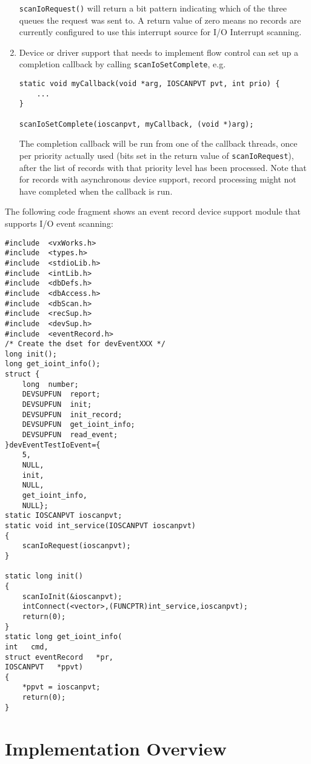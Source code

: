 \begin{enumerate}
\verb|scanIoRequest()| will return a bit pattern indicating which of the three queues the request was sent to.
A return value of zero means no records are currently configured to use this interrupt source for I/O Interrupt scanning.

\item Device or driver support that needs to implement flow control can set up a completion callback by calling \verb|scanIoSetComplete|, e.g.

\begin{verbatim}
static void myCallback(void *arg, IOSCANPVT pvt, int prio) {
    ...
}

scanIoSetComplete(ioscanpvt, myCallback, (void *)arg);
\end{verbatim}

The completion callback will be run from one of the callback threads, once per priority actually used (bits set in the return value of \verb|scanIoRequest|), after the list of records with that priority level has been processed.
Note that for records with asynchronous device support, record processing might not have completed when the callback is run.
\end{enumerate}

The following code fragment shows an event record device support module that supports I/O event scanning: 

\begin{verbatim}
#include  <vxWorks.h>
#include  <types.h>
#include  <stdioLib.h>
#include  <intLib.h>
#include  <dbDefs.h>
#include  <dbAccess.h>
#include  <dbScan.h>
#include  <recSup.h>
#include  <devSup.h>
#include  <eventRecord.h>
/* Create the dset for devEventXXX */
long init();
long get_ioint_info();
struct {
    long  number;
    DEVSUPFUN  report;
    DEVSUPFUN  init;
    DEVSUPFUN  init_record;
    DEVSUPFUN  get_ioint_info;
    DEVSUPFUN  read_event;
}devEventTestIoEvent={
    5,
    NULL,
    init,
    NULL,
    get_ioint_info,
    NULL};
static IOSCANPVT ioscanpvt;
static void int_service(IOSCANPVT ioscanpvt)
{
    scanIoRequest(ioscanpvt);
}

static long init()
{
    scanIoInit(&ioscanpvt);
    intConnect(<vector>,(FUNCPTR)int_service,ioscanpvt);
    return(0);
}
static long get_ioint_info(
int   cmd,
struct eventRecord   *pr,
IOSCANPVT   *ppvt)
{
    *ppvt = ioscanpvt;
    return(0);
}
\end{verbatim}

\section{Implementation Overview}

